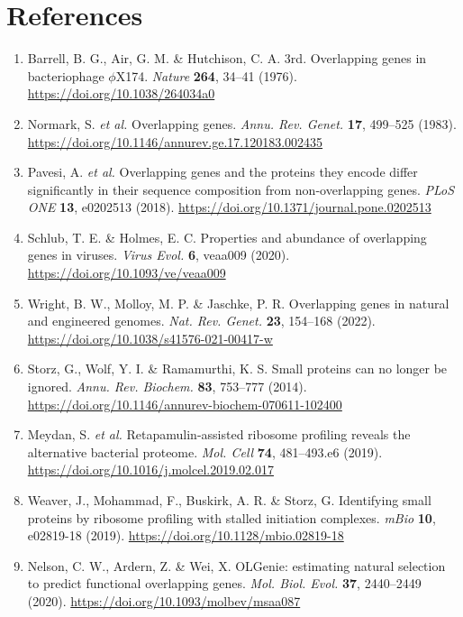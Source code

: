 \documentclass[10pt,letterpaper]{article}
\begin{document}
\section*{References}
{\footnotesize\sloppy{}
\begin{enumerate}[leftmargin=1.9em,itemsep=-0.6pt,parsep=0pt,topsep=0.5pt]
  \item Barrell, B. G., Air, G. M. \& Hutchison, C. A. 3rd. Overlapping genes in bacteriophage $\phi$X174. \textit{Nature} \textbf{264}, 34--41 (1976). \url{https://doi.org/10.1038/264034a0}
  \item Normark, S. \textit{et al.} Overlapping genes. \textit{Annu. Rev. Genet.} \textbf{17}, 499--525 (1983). \url{https://doi.org/10.1146/annurev.ge.17.120183.002435}
  \item Pavesi, A. \textit{et al.} Overlapping genes and the proteins they encode differ significantly in their sequence composition from non-overlapping genes. \textit{PLoS ONE} \textbf{13}, e0202513 (2018). \url{https://doi.org/10.1371/journal.pone.0202513}
  \item Schlub, T. E. \& Holmes, E. C. Properties and abundance of overlapping genes in viruses. \textit{Virus Evol.} \textbf{6}, veaa009 (2020). \url{https://doi.org/10.1093/ve/veaa009}
  \item Wright, B. W., Molloy, M. P. \& Jaschke, P. R. Overlapping genes in natural and engineered genomes. \textit{Nat. Rev. Genet.} \textbf{23}, 154--168 (2022). \url{https://doi.org/10.1038/s41576-021-00417-w}
  \item Storz, G., Wolf, Y. I. \& Ramamurthi, K. S. Small proteins can no longer be ignored. \textit{Annu. Rev. Biochem.} \textbf{83}, 753--777 (2014). \url{https://doi.org/10.1146/annurev-biochem-070611-102400}
  \item Meydan, S. \textit{et al.} Retapamulin-assisted ribosome profiling reveals the alternative bacterial proteome. \textit{Mol. Cell} \textbf{74}, 481--493.e6 (2019). \url{https://doi.org/10.1016/j.molcel.2019.02.017}
  \item Weaver, J., Mohammad, F., Buskirk, A. R. \& Storz, G. Identifying small proteins by ribosome profiling with stalled initiation complexes. \textit{mBio} \textbf{10}, e02819-18 (2019). \url{https://doi.org/10.1128/mbio.02819-18}
  \item Nelson, C. W., Ardern, Z. \& Wei, X. OLGenie: estimating natural selection to predict functional overlapping genes. \textit{Mol. Biol. Evol.} \textbf{37}, 2440--2449 (2020). \url{https://doi.org/10.1093/molbev/msaa087}

\end{enumerate}}
\end{document}
